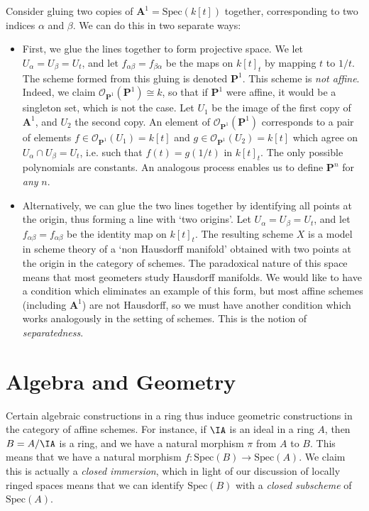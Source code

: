 \begin{example}
    Consider gluing two copies of $\mathbf{A}^1 = \text{Spec}(k[t])$ together, corresponding to two indices $\alpha$ and $\beta$. We can do this in two separate ways:
    \begin{itemize}
        \item First, we glue the lines together to form projective space. We let $U_\alpha = U_\beta = U_t$, and let $f_{\alpha \beta} = f_{\beta \alpha}$ be the maps on $k[t]_t$ by mapping $t$ to $1/t$. The scheme formed from this gluing is denoted $\mathbf{P}^1$. This scheme is \emph{not affine}. Indeed, we claim $\mathcal{O}_{\mathbf{P}^1}(\mathbf{P}^1) \cong k$, so that if $\mathbf{P}^1$ were affine, it would be a singleton set, which is not the case. Let $U_1$ be the image of the first copy of $\mathbf{A}^1$, and $U_2$ the second copy. An element of $\mathcal{O}_{\mathbf{P}^1}(\mathbf{P}^1)$ corresponds to a pair of elements $f \in \mathcal{O}_{\mathbf{P}^1}(U_1) = k[t]$ and $g \in \mathcal{O}_{\mathbf{P}^1}(U_2) = k[t]$ which agree on $U_\alpha \cap U_\beta = U_t$, i.e. such that $f(t) = g(1/t)$ in $k[t]_t$. The only possible polynomials are constants. An analogous process enables us to define $\mathbf{P}^n$ for \emph{any} $n$.

        \item Alternatively, we can glue the two lines together by identifying all points at the origin, thus forming a line with `two origins'. Let $U_\alpha = U_\beta = U_t$, and let $f_{\alpha \beta} = f_{\alpha \beta}$ be the identity map on $k[t]_t$. The resulting scheme $X$ is a model in scheme theory of a `non Hausdorff manifold' obtained with two points at the origin in the category of schemes. The paradoxical nature of this space means that most geometers study Hausdorff manifolds. We would like to have a condition which eliminates an example of this form, but most affine schemes (including $\mathbf{A}^1$) are not Hausdorff, so we must have another condition which works analogously in the setting of schemes. This is the notion of \emph{separatedness}.
    \end{itemize}
\end{example}

\section{Algebra and Geometry}

Certain algebraic constructions in a ring thus induce geometric constructions in the category of affine schemes. For instance, if $\IA$ is an ideal in a ring $A$, then $B = A/\IA$ is a ring, and we have a natural morphism $\pi$ from $A$ to $B$. This means that we have a natural morphism $f: \text{Spec}(B) \to \text{Spec}(A)$. We claim this is actually a \emph{closed immersion}, which in light of our discussion of locally ringed spaces means that we can identify $\text{Spec}(B)$ with a \emph{closed subscheme} of $\text{Spec}(A)$.

